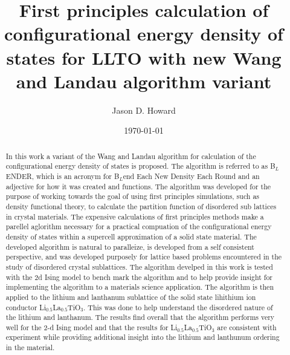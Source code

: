 \documentclass[aps,prl,reprint,superscriptaddress,showkeys]{revtex4-1}
\begin{document}
\title{First principles calculation of configurational energy density of states for LLTO with new Wang and Landau algorithm variant }

\author{Jason D. Howard}

\date{\today}

%


\begin{acknowledgments}
\end{acknowledgments}
\begin{abstract}
In this work  a variant of the Wang and Landau algorithm   for calculation of  the configurational energy density of states is proposed. The algorithm is referred to as B$_L$ENDER, which is an acronym for B$_L$end Each New Density Each Round and an  adjective for  how it was created and functions. The algorithm was developed for the purpose of working towards the goal of using first principles simulations, such as density functional theory, to calculate the partition function of disordered sub lattices in crystal materials. The expensive calculations of first principles methods make a parellel aglorithm necessary for a practical compuation of the configurational energy density of states within a supercell approximation of a solid state material. The developed algorithm is natural to paralleize, is developed from a self consistent perspective, and was developed purposely for lattice based problems encountered in the study of disordered crystal sublattices.  The algorithm develped in this work is tested with the 2d Ising model to bench mark the algorithm and to help provide insight for implementing the algorithm to a materials science application. The algorithm is then applied to the lithium and lanthanum sublattice of the solid state lihithium ion conductor Li$_{0.5}$La$_{0.5}$TiO$_{3}$. This was done to help understand the disordered nature of the lithium and lanthanum. The results find overall that the algorithm performs very well for the 2-d Ising model and that the results for Li$_{0.5}$La$_{0.5}$TiO$_{3}$ are consistent with experiment while providing additional insight into the lithium and lanthunum ordering in the material. 
\end{abstract}
\maketitle
\end{document}
